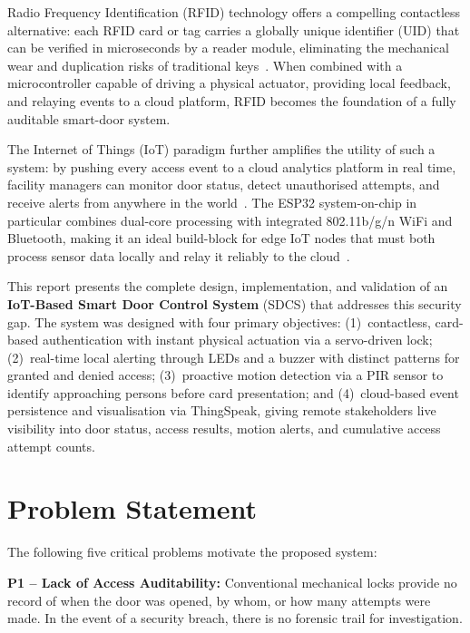 \documentclass[12pt,a4paper]{article}
\begin{document}
Radio Frequency Identification (RFID) technology offers a compelling
contactless alternative: each RFID card or tag carries a globally
unique identifier (UID) that can be verified in microseconds by a
reader module, eliminating the mechanical wear and duplication risks
of traditional keys~\cite{finkenzeller2010}. When combined with a
microcontroller capable of driving a physical actuator, providing
local feedback, and relaying events to a cloud platform, RFID
becomes the foundation of a fully auditable smart-door system.

The Internet of Things (IoT) paradigm further amplifies the utility
of such a system: by pushing every access event to a cloud analytics
platform in real time, facility managers can monitor door status,
detect unauthorised attempts, and receive alerts from anywhere in
the world~\cite{alfuqaha2015}. The ESP32 system-on-chip in particular
combines dual-core processing with integrated 802.11b/g/n WiFi and
Bluetooth, making it an ideal build-block for edge IoT nodes that
must both process sensor data locally and relay it reliably to the
cloud~\cite{esp32ds2023}.

This report presents the complete design, implementation, and
validation of an \textbf{IoT-Based Smart Door Control System} (SDCS)
that addresses this security gap. The system was designed with four
primary objectives:
(1)~contactless, card-based authentication with instant physical
actuation via a servo-driven lock;
(2)~real-time local alerting through LEDs and a buzzer with distinct
patterns for granted and denied access;
(3)~proactive motion detection via a PIR sensor to identify approaching
persons before card presentation; and
(4)~cloud-based event persistence and visualisation via ThingSpeak,
giving remote stakeholders live visibility into door status, access
results, motion alerts, and cumulative access attempt counts.

\section{Problem Statement}
\label{sec:problem}

The following five critical problems motivate the proposed system:

\textbf{P1 -- Lack of Access Auditability:}
Conventional mechanical locks provide no record of when the door
was opened, by whom, or how many attempts were made. In the event
of a security breach, there is no forensic trail for investigation.
\end{document}
